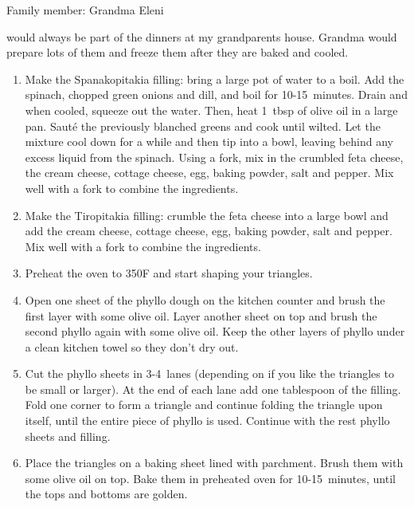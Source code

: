 Family member: Grandma Eleni

 would always be part of the dinners at my grandparents house. Grandma would prepare lots of them and freeze them after they are baked and cooled.

\begin{enumerate}
    \item Make the Spanakopitakia filling: bring a large pot of water to a boil. Add the spinach, chopped green onions and dill, and boil for 10-15~minutes. Drain and when cooled, squeeze out the water. Then, heat 1~tbsp of olive oil in a large pan. Sauté the previously blanched greens and cook until wilted. Let the mixture cool down for a while and then tip into a bowl, leaving behind any excess liquid from the spinach. Using a fork, mix in the crumbled feta cheese, the cream cheese, cottage cheese, egg, baking powder, salt and pepper. Mix well with a fork to combine the ingredients.
    \item Make the Tiropitakia filling: crumble the feta cheese into a large bowl and add the cream cheese, cottage cheese, egg, baking powder, salt and pepper. Mix well with a fork to combine the ingredients.
    \item Preheat the oven to 350\degree F and start shaping your triangles.
    \item Open one sheet of the phyllo dough on the kitchen counter and brush the first layer with some olive oil. Layer another sheet on top and brush the second phyllo again with some olive oil. Keep the other layers of phyllo under a clean kitchen towel so they don't dry out.
    \item Cut the phyllo sheets in 3-4~lanes (depending on if you like the triangles to be small or larger). At the end of each lane add one tablespoon of the filling. Fold one corner to form a triangle and continue folding the triangle upon itself, until the entire piece of phyllo is used. Continue with the rest phyllo sheets and filling.
    \item Place the triangles on a baking sheet lined with parchment. Brush them with some olive oil on top. Bake them in preheated oven for 10-15~minutes, until the tops and bottoms are golden.
\end{enumerate}
